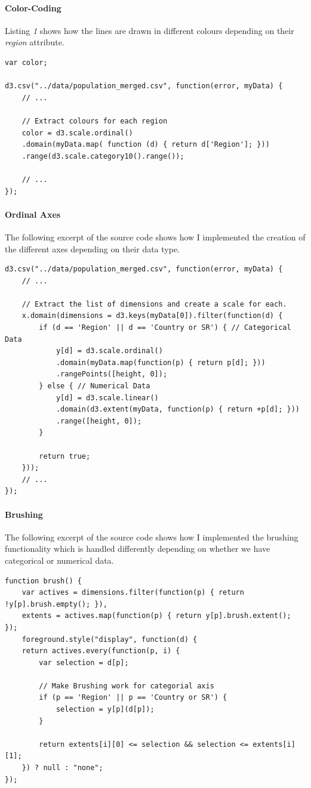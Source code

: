 \documentclass[]{article}
\begin{document}
\paragraph{Color-Coding} Listing \emph{1} shows how the lines are drawn in different colours depending on their \emph{region} attribute. 


\begin{lstlisting}[caption=Color-coding depending on region attribute]
var color;

d3.csv("../data/population_merged.csv", function(error, myData) {
	// ...

	// Extract colours for each region
	color = d3.scale.ordinal()
	.domain(myData.map( function (d) { return d['Region']; }))
	.range(d3.scale.category10().range());

	// ...
});
\end{lstlisting}

\paragraph{Ordinal Axes} The following excerpt of the source code shows how I implemented the creation of the different axes depending on their data type. 
\begin{lstlisting}[caption=Linear and Ordinal Axes]
d3.csv("../data/population_merged.csv", function(error, myData) {
	// ...
	
	// Extract the list of dimensions and create a scale for each.
	x.domain(dimensions = d3.keys(myData[0]).filter(function(d) {
		if (d == 'Region' || d == 'Country or SR') { // Categorical Data
			y[d] = d3.scale.ordinal()
			.domain(myData.map(function(p) { return p[d]; }))
			.rangePoints([height, 0]);
		} else { // Numerical Data
			y[d] = d3.scale.linear()
			.domain(d3.extent(myData, function(p) { return +p[d]; }))
			.range([height, 0]);
		}
		
		return true;
	}));
	// ...
});
\end{lstlisting}


\paragraph{Brushing} The following excerpt of the source code shows how I implemented the brushing functionality which is handled differently depending on whether we have categorical or numerical data. 
\begin{lstlisting}[caption=Brushing for Linear and Ordinal Axis]
function brush() {
	var actives = dimensions.filter(function(p) { return !y[p].brush.empty(); }),
	extents = actives.map(function(p) { return y[p].brush.extent(); });
	foreground.style("display", function(d) {
	return actives.every(function(p, i) {
		var selection = d[p];
		
		// Make Brushing work for categorial axis
		if (p == 'Region' || p == 'Country or SR') { 
			selection = y[p](d[p]);
		}
		
		return extents[i][0] <= selection && selection <= extents[i][1];
	}) ? null : "none";
});
\end{lstlisting}
\end{document}
